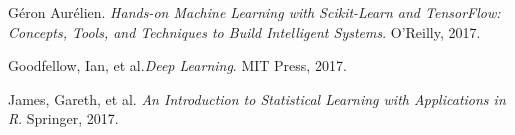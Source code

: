 \documentclass[12pt,letterpaper]{article}
\begin{document}
\begin{thebibliography}{9}


Géron Aurélien. \textit{Hands-on Machine Learning with Scikit-Learn and TensorFlow: Concepts, Tools, and Techniques to Build Intelligent Systems}. O'Reilly, 2017.

Goodfellow, Ian, et al.\textit{Deep Learning}. MIT Press, 2017.

James, Gareth, et al. \textit{An Introduction to Statistical Learning with Applications in R}. Springer, 2017.


\end{thebibliography}


\end{document}
